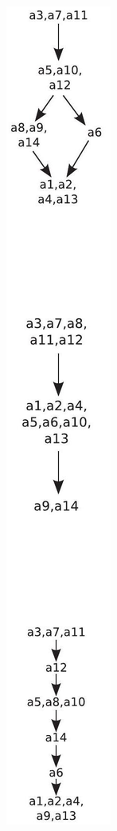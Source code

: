 \documentclass[10pt]{article}
\begin{document}
\includegraphics[max width=\textwidth, center]{2024_01_11_fda3c6ffd32dd805faacg-7}
\end{document}
